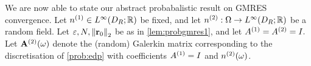 
\ere

We are now able to state our abstract probabalistic result on GMRES convergence.
\label{thm:probgmres}
Let $\nso \in \LiDRRR$ be fixed, and let $\nst:\Omega\rightarrow\LiDRRR$ be a random field. Let $\eps, \dofs, \Nt{\brz}$ be as in \cref{lem:probgmres1}, and let ${A}^{(1)} = {A}^{(2)} = I.$ Let $\mathbf{A}^{(2)}(\omega)$ denote the (random) Galerkin matrix corresponding to the discretisation of \cref{prob:edp} with coefficients ${A}^{(1)}=I$ and ${n}^{(2)}(\omega)$.

